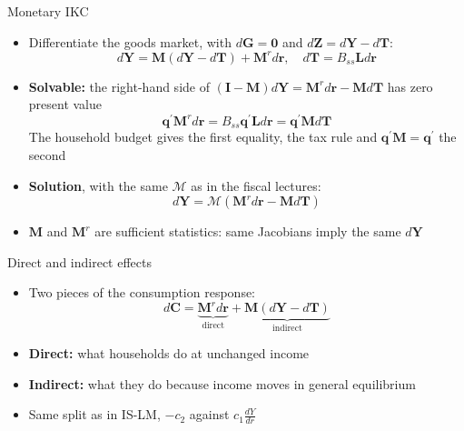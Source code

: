 \documentclass[10pt,english]{beamer}
\begin{document}
%
\begin{frame}{Monetary IKC}
\begin{itemize}
\item <+->Differentiate the goods market, with $d\boldsymbol{G}=\boldsymbol{0}$ and $d\boldsymbol{Z}=d\boldsymbol{Y}-d\boldsymbol{T}$:
\[
d\boldsymbol{Y}=\boldsymbol{M}\left(d\boldsymbol{Y}-d\boldsymbol{T}\right)+\boldsymbol{M}^{r}d\boldsymbol{r},\quad d\boldsymbol{T}=B_{ss}\boldsymbol{L}d\boldsymbol{r}
\]
\item <+->\textbf{Solvable:} the right-hand side of $(\boldsymbol{I}-\boldsymbol{M})d\boldsymbol{Y}=\boldsymbol{M}^{r}d\boldsymbol{r}-\boldsymbol{M}d\boldsymbol{T}$ has zero present value
\[
\boldsymbol{q}^{\prime}\boldsymbol{M}^{r}d\boldsymbol{r}=B_{ss}\boldsymbol{q}^{\prime}\boldsymbol{L}d\boldsymbol{r}=\boldsymbol{q}^{\prime}\boldsymbol{M}d\boldsymbol{T}
\]
The household budget gives the first equality, the tax rule and $\boldsymbol{q}^{\prime}\boldsymbol{M}=\boldsymbol{q}^{\prime}$ the second
\item <+->\textbf{Solution}, with the same $\mathcal{M}$ as in the fiscal lectures:
\[
d\boldsymbol{Y}=\mathcal{M}\left(\boldsymbol{M}^{r}d\boldsymbol{r}-\boldsymbol{M}d\boldsymbol{T}\right)
\]
\item <+->$\boldsymbol{M}$ and $\boldsymbol{M}^{r}$ are sufficient statistics: same Jacobians imply the same $d\boldsymbol{Y}$
\end{itemize}
\end{frame}
%
\begin{frame}{Direct and indirect effects}
\begin{itemize}
\item <+->Two pieces of the consumption response:
\[
d\boldsymbol{C}=\underbrace{\boldsymbol{M}^{r}d\boldsymbol{r}}_{\text{direct}}+\underbrace{\boldsymbol{M}\left(d\boldsymbol{Y}-d\boldsymbol{T}\right)}_{\text{indirect}}
\]
\item <+->\textbf{Direct:} what households do at unchanged income
\item <+->\textbf{Indirect:} what they do because income moves in general equilibrium
\item <+->Same split as in IS-LM, $-c_{2}$ against $c_{1}\frac{dY}{dr}$
\end{itemize}
\end{frame}
%
\end{document}

